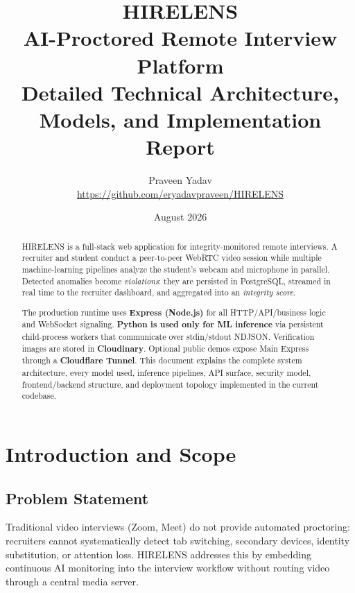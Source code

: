 \documentclass[11pt,a4paper]{report}
\title{
  \textbf{HIRELENS}\\[0.4em]
  \large AI-Proctored Remote Interview Platform\\[0.3em]
  \large Detailed Technical Architecture, Models, and Implementation Report
}
\author{Praveen Yadav\\\url{https://github.com/eryadavpraveen/HIRELENS}}
\date{August 2026}
\begin{document}
\maketitle

\begin{abstract}
HIRELENS is a full-stack web application for integrity-monitored remote interviews. A recruiter and student conduct a peer-to-peer WebRTC video session while multiple machine-learning pipelines analyze the student's webcam and microphone in parallel. Detected anomalies become \emph{violations}: they are persisted in PostgreSQL, streamed in real time to the recruiter dashboard, and aggregated into an \emph{integrity score}.

The production runtime uses \textbf{Express (Node.js)} for all HTTP/API/business logic and WebSocket signaling. \textbf{Python is used only for ML inference} via persistent child-process workers that communicate over stdin/stdout NDJSON. Verification images are stored in \textbf{Cloudinary}. Optional public demos expose Main Express through a \textbf{Cloudflare Tunnel}. This document explains the complete system architecture, every model used, inference pipelines, API surface, security model, frontend/backend structure, and deployment topology implemented in the current codebase.
\end{abstract}

\tableofcontents
\newpage

\chapter{Introduction and Scope}

\section{Problem Statement}
Traditional video interviews (Zoom, Meet) do not provide automated proctoring: recruiters cannot systematically detect tab switching, secondary devices, identity substitution, or attention loss. HIRELENS addresses this by embedding continuous AI monitoring into the interview workflow without routing video through a central media server.
\end{document}
